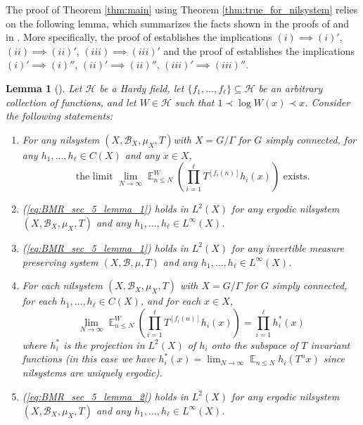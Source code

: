 \documentclass[12pt]{article}
\theoremstyle{plain} %
\newtheorem{lemma}[theorem]{Lemma}
\theoremstyle{definition} %
\theoremstyle{plain}
\theoremstyle{plain}
\numberwithin{equation}{section}
\renewcommand{\leq}{\leqslant}
\renewcommand{\subset}{\subseteq}
\newcommand{\1}{\mathbbm{1}}
\newcommand{\E}{\operatorname{\mathbb{E}}}
\newcommand{\oo}{\infty}
\newcommand{\round}[1]{[ #1 ]}
\begin{document}
The proof of Theorem \ref{thm:main} using Theorem \ref{thm:true_for_nilsystem} relies on the following lemma, which summarizes the facts shown in the proofs of \cite[Theorem B]{BMR24} and \cite[Theorem 5.3]{BMR24} in \cite[Section 5]{BMR24}. More specifically, the proof of \cite[Theorem 5.3]{BMR24} establishes the implications $(i)\implies (i)'$, $(ii)\implies (ii)'$, $(iii)\implies (iii)'$ and the proof of \cite[Theorem B]{BMR24} establishes the implications $(i)'\implies (i)''$, $(ii)'\implies (ii)''$, $(iii)'\implies (iii)''$.


\begin{lemma}[{\cite[Section 5]{BMR24}}]\label{lem:bmr_sec_5}
   Let $\mathcal{H}$ be a Hardy field, let $\{f_1,\dots, f_{\ell}\}\subset\mathcal{H}$ be an arbitrary collection of functions, and let $W\in \mathcal{H}$ such that $1\prec \log W(x)\prec x$. 
   Consider the following statements:
   \begin{enumerate}
    \item[$(i)$] For any nilsystem $(X,\mathscr{B}_X,\mu_X,T)$with $X =G/\Gamma$ for $G$ simply connected, for any $h_1,\dots, h_{\ell}\in C(X)$ and any $x\in X$,
\begin{equation}\label{eq:BMR_sec_5_lemma_1}
    \text{ the limit }\lim_{N\to\oo}\E_{n\leq N}^W\left(\prod_{i=1}^{\ell}T^{\round{f_i(n)}}h_i(x)\right)\text{ exists.}
\end{equation}
       \item[$(i)'$] (\ref{eq:BMR_sec_5_lemma_1}) holds in $L^2(X)$ for any ergodic nilsystem $(X,\mathscr{B}_X,\mu_X,T)$ and any $h_1,\dots, h_{\ell}\in L^{\oo}(X)$.
       \item[$(i)''$] (\ref{eq:BMR_sec_5_lemma_1}) holds in $L^2(X)$ for any invertible measure preserving system $(X,\mathscr{B},\mu,T)$ and any $h_1,\dots, h_{\ell}\in L^{\oo}(X)$.
       \item[$(ii)$] For each nilsystem $(X,\mathscr{B}_X,\mu_X,T)$ with $X =G/\Gamma$ for $G$ simply connected, for each $h_1,\dots, h_{\ell}\in C(X)$, and for each $x\in X$,
\begin{equation}\label{eq:BMR_sec_5_lemma_2}
   \lim_{N\to\oo}\E_{n\leq N}^W\left(\prod_{i=1}^{\ell}T^{\round{f_i(n)}}h_i(x)\right) = \prod_{i=1}^{\ell}h_i^*(x)
\end{equation}
 where $h_i^*$ is the projection in $L^2(X)$ of $h_i$ onto the subspace of $T$ invariant functions (in this case we have $h_i^*(x) = \lim_{N\to\oo}\E_{n\leq N}h_i(T^nx)$ since nilsystems are uniquely ergodic).
       \item[$(ii)'$] (\ref{eq:BMR_sec_5_lemma_2}) holds in $L^2(X)$ for any ergodic nilsystem $(X,\mathscr{B}_X,\mu_X,T)$ and any $h_1,\dots, h_{\ell}\in L^{\oo}(X)$.

\end{enumerate}
\end{lemma}
\end{document}
